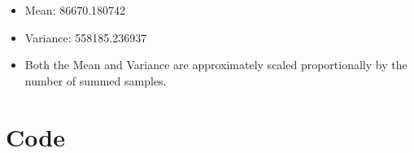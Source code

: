\documentclass[]{report}
\begin{document}
		
		\begin{itemize}
			\item       Mean: 86670.180742
			\item		Variance: 558185.236937
			
			\item Both the Mean and Variance are approximately scaled proportionally by the number of summed samples.
		\end{itemize}
		
			\newpage
		
		\section{Code}
		
		
		
		
\end{document}

